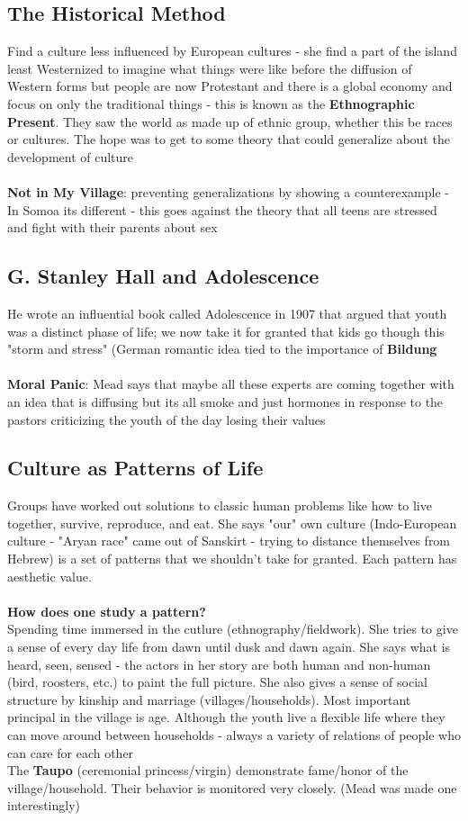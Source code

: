 \documentclass{article}
\begin{document}
\subsection{The Historical Method}
Find a culture less influenced by European cultures - she find a part of the island least Westernized to imagine what things were like before the diffusion of Western forms but people are now Protestant and there is a global economy and focus on only the traditional things - this is known as the \textbf{Ethnographic Present}. They saw the world as made up of ethnic group, whether this be races or cultures. The hope was to get to some theory that could generalize about the development of culture \\ \\ 
\textbf{Not in My Village}: preventing generalizations by showing a counterexample - In Somoa its different - this goes against the theory that all teens are stressed and fight with their parents about sex 

\subsection{G. Stanley Hall and Adolescence}
He wrote an influential book called Adolescence in 1907 that argued that youth was a distinct phase of life; we now take it for granted that kids go though this "storm and stress" (German romantic idea tied to the importance of \textbf{Bildung} \\ \\ 
\textbf{Moral Panic}: Mead says that maybe all these experts are coming together with an idea that is diffusing but its all smoke and just hormones in response to the pastors criticizing the youth of the day losing their values

\subsection{Culture as Patterns of Life}
Groups have worked out solutions to classic human problems like how to live together, survive, reproduce, and eat. She says "our" own culture (Indo-European culture - "Aryan race" came out of Sanskirt - trying to distance themselves from Hebrew) is a set of patterns that we shouldn't take for granted. Each pattern has aesthetic value. \\  \\ 
\textbf{How does one study a pattern?} \\
Spending time immersed in the cutlure (ethnography/fieldwork). She tries to give a sense of every day life from dawn until dusk and dawn again. She says what is heard, seen, sensed - the actors in her story are both human and non-human (bird, roosters, etc.) to paint the full picture. She also gives a sense of social structure  by kinship and marriage (villages/households). Most important principal in the village is age. Although the youth live a flexible life where they can move around between households - always a variety of relations of people who can care for each other \\ 
The \textbf{Taupo} (ceremonial princess/virgin) demonstrate fame/honor of the village/household. Their behavior is monitored very closely. (Mead was made one interestingly)
\end{document}
